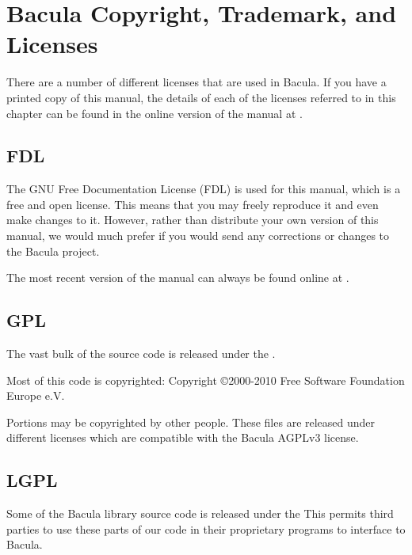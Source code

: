 
\chapter{Bacula Copyright, Trademark, and Licenses}
\label{LicenseChapter}

There are a number of different licenses that are used in Bacula.
If you have a printed copy of this manual, the details of each of
the licenses referred to in this chapter can be found in the
online version of the manual at
.

\section{FDL}

The GNU Free Documentation License (FDL) is used for this manual,
which is a free and open license. This means that you may freely
reproduce it and even make changes to it. However, rather than
distribute your own version of this manual, we would much prefer
if you would send any corrections or changes to the Bacula project.

The most recent version of the manual can always be found online
at .

\section{GPL}

The vast bulk of the source code is released under the
.

Most of this code is copyrighted: Copyright \copyright 2000-2010
Free Software Foundation Europe e.V.

Portions may be copyrighted by other people.  These files are released
under different licenses which are compatible with the Bacula AGPLv3 license.

\section{LGPL}

Some of the Bacula library source code is released under the
 This
permits third parties to use these parts of our code in their proprietary
programs to interface to Bacula.

